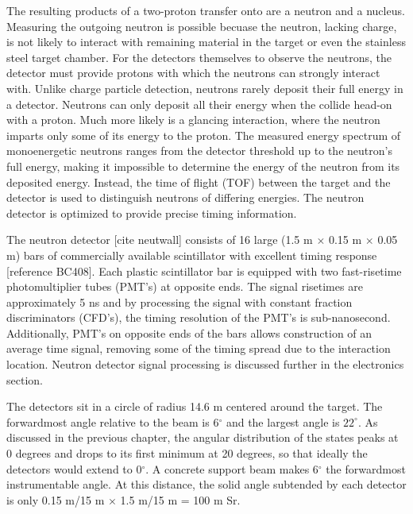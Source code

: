 The resulting products of a two-proton transfer onto \GeTargets are a neutron and a \SeProducts nucleus.  Measuring the outgoing neutron is possible becuase the neutron, lacking charge, is not likely to interact with remaining material in the target or even the stainless steel target chamber.  For the detectors themselves to observe the neutrons, the detector must provide protons with which the neutrons can strongly interact with.  Unlike charge particle detection, neutrons rarely deposit their full energy in a detector.  Neutrons can only deposit all their energy when the collide head-on with a proton.  Much more likely is a glancing interaction, where the neutron imparts only some of its energy to the proton.  The measured energy spectrum of monoenergetic neutrons ranges from the detector threshold up to the neutron's full energy, making it impossible to determine the energy of the neutron from its deposited energy.  Instead, the time of flight (TOF) between the target and the detector is used to distinguish neutrons of differing energies.  The neutron detector is optimized to provide precise timing information.       

The neutron detector [cite neutwall] consists of 16 large (1.5 m $\times$ 0.15 m $\times$ 0.05 m) bars of commercially available scintillator with excellent timing response [reference BC408].  Each plastic scintillator bar is equipped with two fast-risetime photomultiplier tubes (PMT's) at opposite ends.  The signal risetimes are approximately 5 ns and by processing the signal with constant fraction discriminators (CFD's), the timing resolution of the PMT's is sub-nanosecond.  Additionally, PMT's on opposite ends of the bars allows construction of an average time signal, removing some of the timing spread due to the interaction location.  Neutron detector signal processing is discussed further in the electronics section.

The detectors sit in a circle of radius 14.6 m centered around the target.  The forwardmost angle relative to the beam is 6$^{\circ}$ and the largest angle is $22^{\circ}$.  As discussed in the previous chapter, the angular distribution of the \zp states peaks at 0 degrees and drops to its first minimum at 20 degrees, so that ideally the detectors would extend to 0$^{\circ}$.  A concrete support beam makes 6$^{\circ}$ the forwardmost instrumentable angle.  At this distance, the solid angle subtended by each detector is only 0.15 m/15 m $\times$ 1.5 m/15 m = 100 m Sr.

